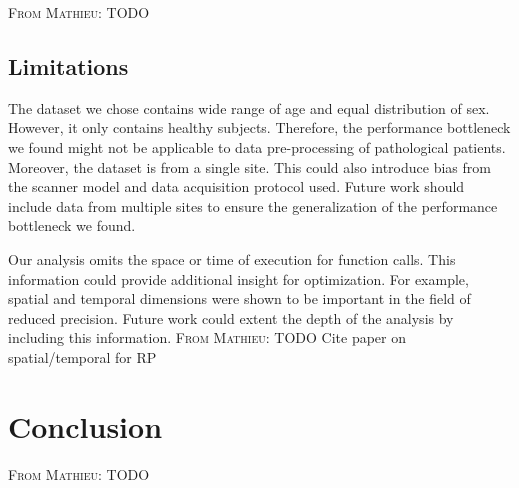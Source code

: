 \documentclass[conference]{IEEEtran}
\newcommand{\MD}[1]{\color{magenta}\textsc{From Mathieu: }#1\color{black}}
\begin{document}
\MD{TODO}






\subsection{Limitations}
The dataset we chose contains wide range of age and equal distribution of sex. However, it only contains healthy subjects. Therefore, the performance bottleneck we found might not be applicable to data pre-processing of pathological patients. Moreover, the dataset is from a single site. This could also introduce bias from the scanner model and data acquisition protocol used. Future work should include data from multiple sites to ensure the generalization of the performance bottleneck we found.

Our analysis omits the space or time of execution for function calls. This information could provide additional insight for optimization. For example, spatial and temporal dimensions were shown to be important in the field of reduced precision. Future work could extent the depth of the analysis by including this information.
\MD{TODO Cite paper on spatial/temporal for RP}

\section{Conclusion}
\MD{TODO}
\end{document}
